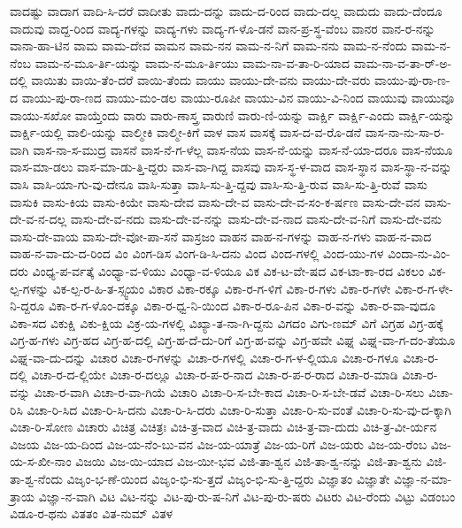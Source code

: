 {ವಾದಷ್ಟು
ವಾದಾಗ
ವಾದಿ-ಸಿ-ದರೆ
ವಾದೀತು
ವಾದು-ದನ್ನು
ವಾದು-ದ-ರಿಂದ
ವಾದು-ದಲ್ಲ
ವಾದುದು
ವಾದು-ದೆಂದೂ
ವಾದುವು
ವಾದ್ದ-ರಿಂದ
ವಾದ್ಯ-ಗಳನ್ನು
ವಾದ್ಯ-ಗಳು
ವಾದ್ಯ-ಗ-ಳೊ-ಡನೆ
ವಾನ-ಪ್ರ-ಸ್ಥ-ವೆಂಬ
ವಾನರ
ವಾನ-ರ-ನನ್ನು
ವಾನಾ-ಹಾ-ಟಿನ
ವಾಮ
ವಾಮ-ದೇವ
ವಾಮನ
ವಾಮ-ನನ
ವಾಮ-ನ-ನಿಗೆ
ವಾಮ-ನನು
ವಾಮ-ನ-ನೆಂದು
ವಾಮ-ನ-ನೆಂಬ
ವಾಮ-ನ-ಮೂ-ರ್ತಿ-ಯನ್ನು
ವಾಮ-ನ-ಮೂ-ರ್ತಿಯು
ವಾಮ-ನಾ-ವ-ತಾ-ರಿ-ಯಾದ
ವಾಮ-ನಾ-ವ-ತಾ-ರ್-ಅ-ದಲ್ಲಿ
ವಾಯಿತು
ವಾಯಿ-ತೆಂ-ದರೆ
ವಾಯಿ-ತೆಂದು
ವಾಯು
ವಾಯು-ದೇ-ವನು
ವಾಯು-ದೇ-ವರು
ವಾಯು-ಪು-ರಾ-ಣ-ದ
ವಾಯು-ಪು-ರಾ-ಣದ
ವಾಯು-ಮಂ-ಡಲ
ವಾಯು-ರೂಪೀ
ವಾಯು-ವಿನ
ವಾಯು-ವಿ-ನಿಂದ
ವಾಯುವು
ವಾಯುವೂ
ವಾಯು-ಸಖೋ
ವಾಯ್ತೆಂದು
ವಾರು
ವಾರು-ಣಾಸ್ತ್ರ
ವಾರುಣಿ
ವಾರು-ಣಿ-ಯನ್ನು
ವಾರ್ಕ್ಷಿ
ವಾರ್ಕ್ಷಿ-ಎಂದು
ವಾರ್ಕ್ಷಿ-ಯನ್ನು
ವಾರ್ಕ್ಷಿ-ಯಲ್ಲಿ
ವಾಲಿ-ಯನ್ನು
ವಾಲ್ಮೀಕಿ
ವಾಲ್ಮೀ-ಕಿಗೆ
ವಾಳ
ವಾಸ
ವಾಸಕ್ಕೆ
ವಾಸ-ದ-ವ-ರೊ-ಡನೆ
ವಾಸ-ನಾ-ನು-ಸಾ-ರ-ವಾಗಿ
ವಾಸ-ನಾ-ಸ-ಮುದ್ರ
ವಾಸನೆ
ವಾಸ-ನೆ-ಗ-ಳೆಲ್ಲ
ವಾಸ-ನೆಯ
ವಾಸ-ನೆ-ಯನ್ನು
ವಾಸ-ನೆ-ಯಾ-ದರೂ
ವಾಸ-ನೆಯೂ
ವಾಸ-ಮಾ-ಡಲು
ವಾಸ-ಮಾ-ಡು-ತ್ತಿ-ದ್ದರು
ವಾಸ-ವಾ-ಗಿದ್ದ
ವಾಸವು
ವಾಸ-ಸ್ಥ-ಳ-ವಾದ
ವಾಸ-ಸ್ಥಾನ
ವಾಸ-ಸ್ಥಾ-ನ-ವನ್ನು
ವಾಸಿ
ವಾಸಿ-ಯಾ-ಗು-ವು-ದೇನೂ
ವಾಸಿ-ಸುತ್ತಾ
ವಾಸಿ-ಸು-ತ್ತಿ-ದ್ದವು
ವಾಸಿ-ಸು-ತ್ತಿ-ರುವ
ವಾಸಿ-ಸು-ತ್ತಿ-ರುವೆ
ವಾಸು
ವಾಸುಕಿ
ವಾಸು-ಕಿಯ
ವಾಸು-ಕಿಯೇ
ವಾಸು-ದೇವ
ವಾಸು-ದೇ-ವ
ವಾಸು-ದೇ-ವ-ಸಂ-ಕ-ರ್ಷಣ
ವಾಸು-ದೇ-ವನ
ವಾಸು-ದೇ-ವ-ನ-ದಲ್ಲ
ವಾಸು-ದೇ-ವ-ನದು
ವಾಸು-ದೇ-ವ-ನನ್ನು
ವಾಸು-ದೇ-ವ-ನಾದ
ವಾಸು-ದೇ-ವ-ನಿಗೆ
ವಾಸು-ದೇ-ವನು
ವಾಸು-ದೇ-ವಾಯ
ವಾಸು-ದೇ-ವೋ-ಪಾ-ಸನೆ
ವಾಸ್ರಜಂ
ವಾಹನ
ವಾಹ-ನ-ಗಳನ್ನು
ವಾಹ-ನ-ಗಳು
ವಾಹ-ನ-ವಾದ
ವಾಹ-ನ-ವಾ-ದು-ದ-ರಿಂದ
ವಿಂ
ವಿಂಗ-ಡಿಸ
ವಿಂಗ-ಡಿ-ಸಿ-ದನು
ವಿಂದ
ವಿಂದ-ಗಳಲ್ಲಿ
ವಿಂದ-ಯು-ಗಳ
ವಿಂದಾ-ನು-ವಿಂ-ದರು
ವಿಂಧ್ಯ-ಪ-ರ್ವತ್ಕೆ
ವಿಂಧ್ಯಾ-ವ-ಳಿಯು
ವಿಂಧ್ಯಾ-ವ-ಳಿಯೂ
ವಿಕ
ವಿಕ-ಟ-ವೇ-ಷದ
ವಿಕ-ಟಾ-ಕಾ-ರದ
ವಿಕಲಂ
ವಿಕ-ಲ್ಪ-ಗಳನ್ನು
ವಿಕ-ಲ್ಪ-ರ-ಹಿ-ತ-ಸ್ಸ್ವಯಂ
ವಿಕಾರ
ವಿಕಾ-ರಕ್ಕೂ
ವಿಕಾ-ರ-ಗ-ಳಿಗೆ
ವಿಕಾ-ರ-ಗಳು
ವಿಕಾ-ರ-ಗಳೇ
ವಿಕಾ-ರ-ಗ-ಳೇ-ನಿ-ದ್ದರೂ
ವಿಕಾ-ರ-ಗ-ಳೊಂ-ದಕ್ಕೂ
ವಿಕಾ-ರ-ಧ್ವ-ನಿ-ಯಿಂದ
ವಿಕಾ-ರ-ರೂ-ಪಿನ
ವಿಕಾ-ರ-ವನ್ನು
ವಿಕಾ-ರ-ವಾ-ವುದೂ
ವಿಕಾ-ಸದ
ವಿಕುಕ್ಷಿ
ವಿಕು-ಕ್ಷಿಯ
ವಿಕ್ರ-ಯ-ಗಳಲ್ಲಿ
ವಿಖ್ಯಾ-ತ-ನಾ-ಗಿ-ದ್ದನು
ವಿಗದಂ
ವಿಗು-ಣಮ್
ವಿಗೆ
ವಿಗ್ರಹ
ವಿಗ್ರ-ಹಕ್ಕೆ
ವಿಗ್ರ-ಹ-ಗಳು
ವಿಗ್ರ-ಹದ
ವಿಗ್ರ-ಹ-ದಲ್ಲಿ
ವಿಗ್ರ-ಹ-ದೆ-ದು-ರಿಗೆ
ವಿಗ್ರ-ಹ-ವನ್ನು
ವಿಗ್ರ-ಹವೇ
ವಿಘ್ನ
ವಿಘ್ನ-ವಾ-ಗ-ದಂ-ತೆಯೂ
ವಿಘ್ನ-ವಾ-ದು-ದನ್ನು
ವಿಚಾರ
ವಿಚಾ-ರ-ಗಳನ್ನು
ವಿಚಾ-ರ-ಗಳಲ್ಲಿ
ವಿಚಾ-ರ-ಗ-ಳ-ಲ್ಲಿಯೂ
ವಿಚಾ-ರ-ಗಳೂ
ವಿಚಾ-ರ-ದಲ್ಲಿ
ವಿಚಾ-ರ-ದ-ಲ್ಲಿಯೇ
ವಿಚಾ-ರ-ದಲ್ಲೂ
ವಿಚಾ-ರ-ಪ-ರ-ನಾದ
ವಿಚಾ-ರ-ಪ-ರ-ರಾದ
ವಿಚಾ-ರ-ಮಾಡಿ
ವಿಚಾ-ರ-ವನ್ನು
ವಿಚಾ-ರ-ವಾಗಿ
ವಿಚಾ-ರ-ವಾ-ಗಿಯೆ
ವಿಚಾರಿ
ವಿಚಾ-ರಿ-ಸ-ಬೇ-ಕಾದ
ವಿಚಾ-ರಿ-ಸ-ಬೇ-ಡವೆ
ವಿಚಾ-ರಿ-ಸಲು
ವಿಚಾ-ರಿಸಿ
ವಿಚಾ-ರಿ-ಸಿದ
ವಿಚಾ-ರಿ-ಸಿ-ದನು
ವಿಚಾ-ರಿ-ಸಿ-ದರು
ವಿಚಾ-ರಿ-ಸುತ್ತಾ
ವಿಚಾ-ರಿ-ಸು-ವಂತೆ
ವಿಚಾ-ರಿ-ಸು-ವು-ದ-ಕ್ಕಾಗಿ
ವಿಚಾ-ರಿ-ಸೋಣ
ವಿಚಾರು
ವಿಚಿತ್ರ
ವಿಚಿತ್ರಃ
ವಿಚಿ-ತ್ರ-ವಾದ
ವಿಚಿ-ತ್ರ-ವಾದು
ವಿಚಿ-ತ್ರ-ವಾ-ದುದು
ವಿಚಿ-ತ್ರ-ವೀ-ರ್ಯನ
ವಿಜಯ
ವಿಜ-ಯ-ದಿಂದ
ವಿಜ-ಯ-ನೆಂ-ಬು-ವನ
ವಿಜ-ಯ-ಯಾತ್ರೆ
ವಿಜ-ಯ-ರಿಗೆ
ವಿಜ-ಯರು
ವಿಜ-ಯ-ರೆಂಬ
ವಿಜ-ಯ-ಸ-ಖೀ-ನಾಂ
ವಿಜಯಿ
ವಿಜ-ಯಿ-ಯಾದ
ವಿಜ-ಯೀ-ಭವ
ವಿಜಿ-ತಾ-ಶ್ವನ
ವಿಜಿ-ತಾ-ಶ್ವ-ನನ್ನು
ವಿಜಿ-ತಾ-ಶ್ವನು
ವಿಜಿ-ತಾ-ಶ್ವ-ನೆಂದು
ವಿಜೃಂ-ಭ-ಣೆ-ಯಿಂದ
ವಿಜೃಂ-ಭಿ-ಸು-ತ್ತದೆ
ವಿಜೃಂ-ಭಿ-ಸು-ತ್ತಿ-ದ್ದರು
ವಿಜ್ಞಾತಂ
ವಿಜ್ಞಾತೇ
ವಿಜ್ಞಾ-ನ-ಮಾ-ತ್ರಾಯ
ವಿಜ್ಞಾ-ನ-ವಾಗಿ
ವಿಟ
ವಿಟ-ನನ್ನು
ವಿಟ-ಪು-ರು-ಷ-ನಿಗೆ
ವಿಟ-ಪು-ರು-ಷರು
ವಿಟರು
ವಿಟ-ರೆಂದು
ವಿಟ್ಟು
ವಿಡಂಬಂ
ವಿಡೂ-ರ-ಥನು
ವಿತತಂ
ವಿತ-ನುಮ್
ವಿತಳ
}
